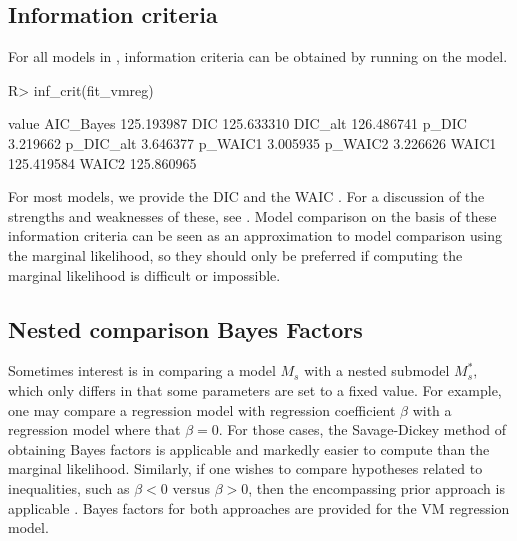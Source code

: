 \hypertarget{information-criteria}{%
\subsection{Information criteria}\label{information-criteria}}

\label{infcrit}

For all models in , information criteria can be obtained
by running  on the model.

\begin{CodeChunk}

\begin{CodeInput}
R> inf_crit(fit_vmreg)
\end{CodeInput}

\begin{CodeOutput}
               value
AIC_Bayes 125.193987
DIC       125.633310
DIC_alt   126.486741
p_DIC       3.219662
p_DIC_alt   3.646377
p_WAIC1     3.005935
p_WAIC2     3.226626
WAIC1     125.419584
WAIC2     125.860965
\end{CodeOutput}
\end{CodeChunk}

For most models, we provide the DIC \citep{spiegelhalter2002bayesian}
and the WAIC \citep{watanabe2010asymptotic}. For a discussion of the
strengths and weaknesses of these, see
\citet[Ch. 7]{gelman2003bayesian}. Model comparison on the basis of
these information criteria can be seen as an approximation to model
comparison using the marginal likelihood, so they should only be
preferred if computing the marginal likelihood is difficult or
impossible.

\hypertarget{nested-comparison-bayes-factors}{%
\subsection{Nested comparison Bayes
Factors}\label{nested-comparison-bayes-factors}}

\label{sec:nested}

Sometimes interest is in comparing a model \(M_s\) with a nested
submodel \(M^\ast_s,\) which only differs in that some parameters are
set to a fixed value. For example, one may compare a regression model
with regression coefficient \(\beta\) with a regression model where that
\(\beta = 0.\) For those cases, the Savage-Dickey method of obtaining
Bayes factors is applicable
\citep{dickey1970weighted, o2004kendall, wagenmakers2010sdd} and
markedly easier to compute than the marginal likelihood. Similarly, if
one wishes to compare hypotheses related to inequalities, such as
\(\beta < 0\) versus \(\beta > 0\), then the encompassing prior approach
is applicable \citet{klugkist2005inequality, wetzels2010encompassing}.
Bayes factors for both approaches are provided for the VM regression
model.


